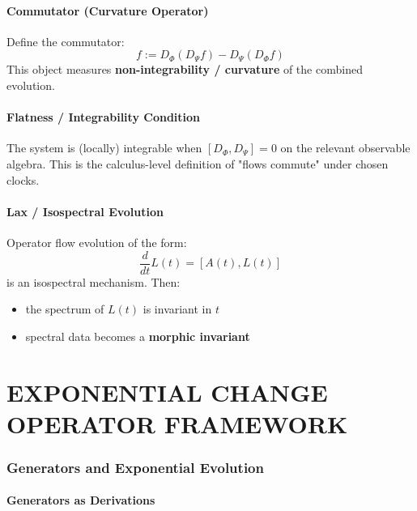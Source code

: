 \documentclass[12pt, oneside]{article}
\begin{document}
\subsection{Commutator (Curvature Operator)}

Define the commutator:
\begin{equation}
[D_\Phi, D_\Psi] f := D_\Phi (D_\Psi f) - D_\Psi (D_\Phi f)
\end{equation}
This object measures \textbf{non-integrability / curvature} of the combined evolution.

\subsection{Flatness / Integrability Condition}

The system is (locally) integrable when $[D_\Phi, D_\Psi] = 0$ on the relevant observable algebra. This is the calculus-level definition of "flows commute" under chosen clocks.

\subsection{Lax / Isospectral Evolution}

Operator flow evolution of the form:
\begin{equation}
\frac{d}{dt} L(t) = [A(t), L(t)]
\end{equation}
is an isospectral mechanism. Then:
\begin{itemize}
    \item the spectrum of $L(t)$ is invariant in $t$
    \item spectral data becomes a \textbf{morphic invariant}
\end{itemize}

\newpage

\part{EXPONENTIAL CHANGE OPERATOR FRAMEWORK}

\section{Generators and Exponential Evolution}

\subsection{Generators as Derivations}
\end{document}
